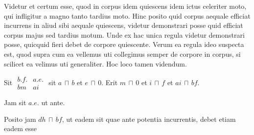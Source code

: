 \pend \pstart
Videtur et certum esse, quod in corpus idem quiescens%
\protect{} idem ictus\protect{} 
celeriter moto,%
\protect{} qui infligitur a magno tanto tardius moto.%
\protect{} 
\pend \pstart
Hinc posito quid corpus aequale efficiat incurrens in aliud sibi aequale 
quiescens,%
\protect{} videtur demonstrari posse quid efficiat corpus majus sed tardius motum.%
\protect{}
Unde ex hac unica regula videtur demonstrari posse, quicquid fieri debet de corpore
quiescente.%
\protect{} Verum ea regula ideo suspecta est, quod
supra cum
ea vellemus uti
collegimus semper
de corpore in corpus, si
scilicet ea velimus uti generaliter. Hoc loco tamen
%
%
videndum.
\pend
%
\pstart
\rule[0cm]{0mm}{20pt}Sit%
$\begin{array}{c|c}
b.f. & a.e.\\
\hline
bm & ai
\end{array}$
sit $a\,\sqcap\,b$ et $e\,\sqcap\,0$. Erit $m\,\sqcap\,0$ et $i\,\sqcap\,f$ et $ai\,\sqcap\,bf$.%
\pend
%
\pstart\noindent
\rule[0cm]{0mm}{20pt}Jam sit
$a.e.$ ut ante.
%
\pend \pstart\noindent
\rule[0cm]{0mm}{12pt}Posito jam $dh\,\sqcap\,bf$, ut eadem sit quae ante potentia incurrentis, debet
etiam eadem esse 
